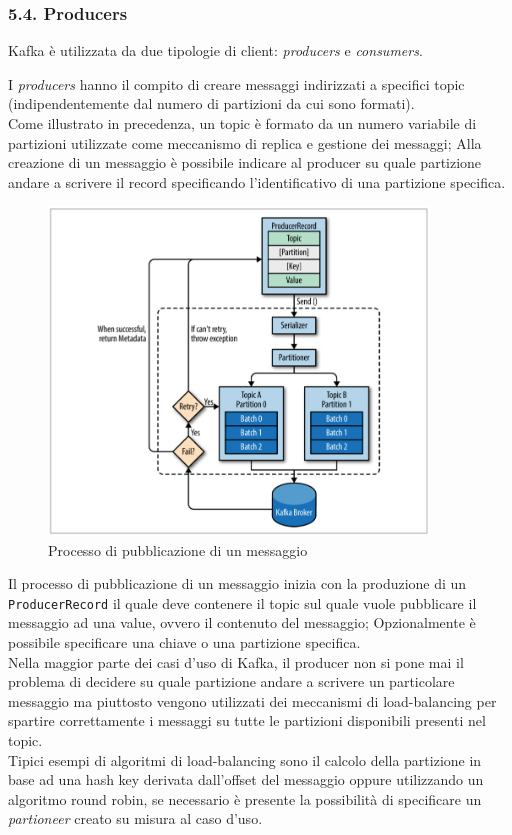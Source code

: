 \documentclass[]{article}
\begin{document}
\newpage

\subsubsection{5.4. Producers}\label{producers}

Kafka è utilizzata da due tipologie di client: \emph{producers} e
\emph{consumers}.

I \emph{producers} hanno il compito di creare messaggi indirizzati a
specifici topic (indipendentemente dal numero di partizioni da cui sono
formati).\\
Come illustrato in precedenza, un topic è formato da un numero variabile
di partizioni utilizzate come meccanismo di replica e gestione dei
messaggi; Alla creazione di un messaggio è possibile indicare al
producer su quale partizione andare a scrivere il record specificando
l'identificativo di una partizione specifica.

\begin{figure}
\centering
\includegraphics[width=0.90000\textwidth]{../images/producer-process.png}
\caption{Processo di pubblicazione di un messaggio \label{figure_3}}
\end{figure}

Il processo di pubblicazione di un messaggio inizia con la produzione di
un \texttt{ProducerRecord} il quale deve contenere il topic sul quale
vuole pubblicare il messaggio ad una value, ovvero il contenuto del
messaggio; Opzionalmente è possibile specificare una chiave o una
partizione specifica.\\
Nella maggior parte dei casi d'uso di Kafka, il producer non si pone mai
il problema di decidere su quale partizione andare a scrivere un
particolare messaggio ma piuttosto vengono utilizzati dei meccanismi di
load-balancing per spartire correttamente i messaggi su tutte le
partizioni disponibili presenti nel topic.\\
Tipici esempi di algoritmi di load-balancing sono il calcolo della
partizione in base ad una hash key derivata dall'offset del messaggio
oppure utilizzando un algoritmo round robin, se necessario è presente la
possibilità di specificare un \emph{partioneer} creato su misura al caso
d'uso.
\end{document}
